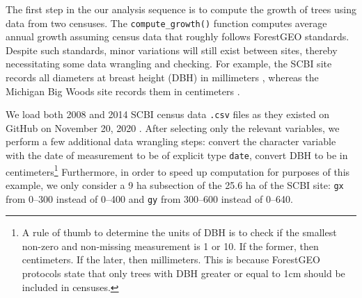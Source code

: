 \documentclass[12pt]{article}
\begin{document}
The first step in the our analysis sequence is to compute the growth of
trees using data from two censuses. The \texttt{compute\_growth()}
function computes average annual growth assuming census data that
roughly follows ForestGEO standards. Despite such standards, minor
variations will still exist between sites, thereby necessitating some
data wrangling and checking. For example, the SCBI site records all
diameters at breast height (DBH) in millimeters
\citep{bourg_initial_2013}, whereas the Michigan Big Woods site records
them in centimeters \citep{allen_michigan_2020}.

We load both 2008 and 2014 SCBI census data \texttt{.csv} files as they
existed on GitHub on November 20, 2020
\citep{gonzalez-akre_scbi-forestgeoscbi-forestgeo-data_2020}. After
selecting only the relevant variables, we perform a few additional data
wrangling steps: convert the character variable with the date of
measurement to be of explicit type \texttt{date}, convert DBH to be in
centimeters\footnote{A rule of thumb to determine the units of DBH is to
  check if the smallest non-zero and non-missing measurement is 1 or 10.
  If the former, then centimeters. If the later, then millimeters. This
  is because ForestGEO protocols state that only trees with DBH greater
  or equal to 1cm should be included in censuses.} Furthermore, in order
to speed up computation for purposes of this example, we only consider a
9 ha subsection of the 25.6 ha of the SCBI site: \texttt{gx} from 0--300
instead of 0--400 and \texttt{gy} from 300--600 instead of 0--640.
\end{document}

